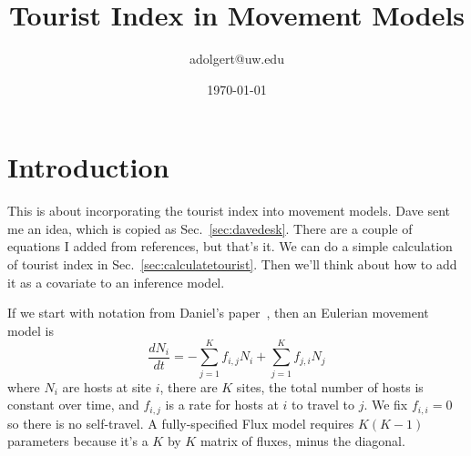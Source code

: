 \documentclass{article}
\title{Tourist Index in Movement Models}
\author{adolgert@uw.edu}
\date{\today}
\begin{document}
\maketitle

\section{Introduction}
This is about incorporating the tourist index into movement models. Dave sent me an idea, which is copied as Sec.~\ref{sec:davedesk}. There are a couple of equations I added from references, but that's it. We can do a simple calculation of tourist index in Sec.~\ref{sec:calculatetourist}. Then we'll think about how to add it as a covariate to an inference model.

If we start with notation from Daniel's paper~\cite{Citron2021-jt}, then an Eulerian movement model is
\begin{equation}
  \frac{dN_i}{dt} = -\sum_{j=1}^K f_{i,j} N_i + \sum_{j=1}^K f_{j,i} N_j\label{eqn:citron1}
\end{equation}
where $N_i$ are hosts at site $i$, there are $K$ sites, the total number of hosts is constant over time, and $f_{i,j}$ is a rate for hosts at $i$ to travel to $j$. We fix $f_{i,i}=0$ so there is no self-travel. A fully-specified Flux model requires $K(K-1)$ parameters because it's a $K$ by $K$ matrix of fluxes, minus the diagonal.
\end{document}

